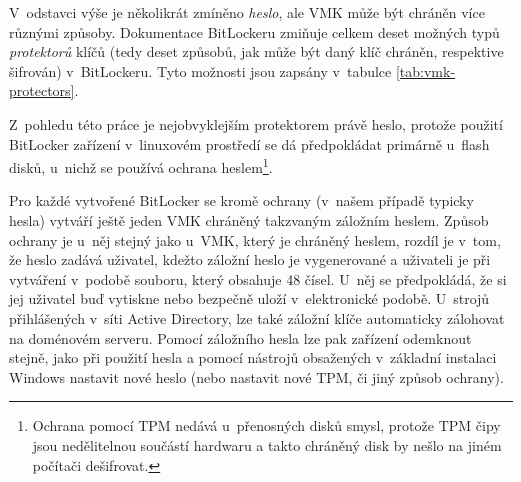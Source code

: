 V~odstavci výše je několikrát zmíněno \emph{heslo}, ale VMK může být chráněn více různými způsoby. Dokumentace BitLockeru \cite{Zxwr6wjYZUQ6z8Yo} zmiňuje celkem deset možných typů \emph{protektorů} klíčů (tedy deset způsobů, jak může být daný klíč chráněn, respektive šifrován) v~BitLockeru. Tyto možnosti jsou zapsány v~tabulce \ref{tab:vmk-protectors}.


Z~pohledu této práce je nejobvyklejším protektorem právě heslo, protože použití BitLocker zařízení v~linuxovém prostředí se dá předpokládat primárně u~flash disků, u~nichž se používá ochrana heslem\footnote{Ochrana pomocí TPM nedává u~přenosných disků smysl, protože TPM čipy jsou nedělitelnou součástí hardwaru a takto chráněný disk by nešlo na jiném počítači dešifrovat.}.

Pro každé vytvořené BitLocker se kromě  ochrany (v~našem případě typicky hesla) vytváří ještě jeden VMK chráněný takzvaným záložním heslem. Způsob ochrany je u~něj stejný jako u~VMK, který je chráněný heslem, rozdíl je v~tom, že heslo zadává uživatel, kdežto záložní heslo je vygenerované a uživateli je při vytváření  v~podobě souboru, který obsahuje 48 čísel. U~něj se předpokládá, že si jej uživatel buď vytiskne nebo bezpečně uloží v~elektronické podobě. U~strojů přihlášených v~síti Active Directory, lze také záložní klíče automaticky zálohovat na doménovém serveru. Pomocí záložního hesla lze pak zařízení odemknout stejně, jako při použití  hesla a pomocí nástrojů obsažených v~základní instalaci Windows nastavit nové heslo (nebo nastavit nové TPM, či jiný způsob ochrany).\cite{Hall2019,MS2011}


